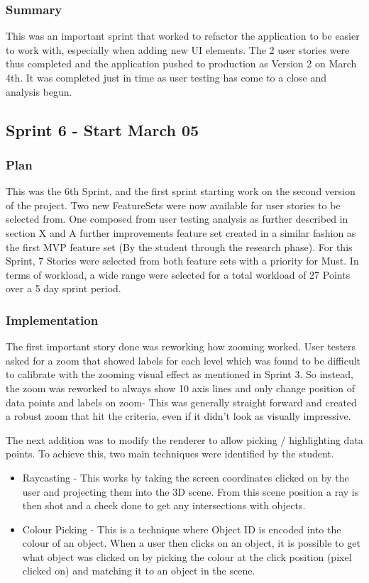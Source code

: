 \subsubsection{Summary}
This was an important sprint that worked to refactor the application to be easier to work with, especially when adding new UI elements.
The 2 user stories were thus completed and the application pushed to production as Version 2 on March 4th.
It was completed just in time as user testing has come to a close and analysis begun.

\subsection{Sprint 6 - Start March 05}
\subsubsection{Plan}
This was the 6th Sprint, and the first sprint starting work on the second version of the project. Two new FeatureSets were now available for user stories to be selected from. One composed from user testing analysis as further described in section X and A further improvements feature set created in a similar fashion as the first MVP feature set (By the student through the research phase). For this Sprint, 7 Stories were selected from both feature sets with a priority for Must. In terms of workload, a wide range were selected for a total workload of 27 Points over a 5 day sprint period.

\subsubsection{Implementation}
The first important story done was reworking how zooming worked. User testers asked for a zoom that showed labels for each level which was found to be difficult to calibrate with the zooming visual effect as mentioned in Sprint 3. So instead, the zoom was reworked to always show 10 axis lines and only change position of data points and labels on zoom- This was generally straight forward and created a robust zoom that hit the criteria, even if it didn't look as visually impressive.

The next addition was to modify the renderer to allow picking / highlighting data points. To achieve this, two main techniques were identified by the student.
\begin{itemize}
    \item Raycasting - This works by taking the screen coordinates clicked on by the user and projecting them into the 3D scene. From this scene position a ray is then shot and a check done to get any intersections with objects.
    \item Colour Picking - This is a technique where Object ID is encoded into the colour of an object. When a user then clicks on an object, it is possible to get what object was clicked on by picking the colour at the click position (pixel clicked on) and matching it to an object in the scene.
\end{itemize}

